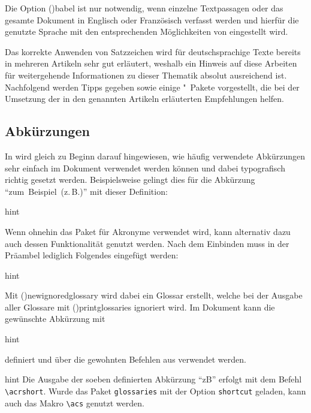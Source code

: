 \documentclass[%
  english,ngerman,%
  cdgeometry=no,DIV=12,%
  cd=false,cdfont=false,cdtitle=true,%
  headings=normal,%
  automark,%
  listof=toc,%
]{tudscrartcl}
\newcommand*\newabbreviation[4][]{%
    \newacronym[type=abbreviation,#1]{#2}{#3}{#4}%
  }%
\begin{document}
Die Option \Option(){babel} ist nur notwendig, wenn einzelne 
Textpassagen oder das gesamte Dokument in Englisch oder Französisch verfasst 
werden und hierfür die genutzte Sprache mit den entsprechenden Möglichkeiten 
von  eingestellt wird.

Das korrekte Anwenden von Satzzeichen wird für deutschsprachige Texte bereits 
in mehreren Artikeln \cite{neubauer1996,neubauer1997,struckmann2007,bier2009} 
sehr gut erläutert, weshalb ein Hinweis auf diese Arbeiten für weitergehende 
Informationen zu dieser Thematik absolut ausreichend ist. Nachfolgend werden 
Tipps gegeben sowie einige "~Pakete vorgestellt, die bei der 
Umsetzung der in den genannten Artikeln erläuterten Empfehlungen helfen.



\subsection{Abkürzungen}

In \cite{struckmann2007} wird gleich zu Beginn darauf hingewiesen, wie häufig 
verwendete Abkürzungen sehr einfach im Dokument verwendet werden können und 
dabei typografisch richtig gesetzt werden. Beispielsweise gelingt dies für die 
Abkürzung \enquote{zum~Beispiel~(z.\,B.)} mit dieser Definition:
%
\begin{Code}{hint}
\newcommand*\zB{\mbox{z.\,B.}\xspace}
\end{Code}

Wenn ohnehin das Paket  für Akronyme verwendet wird, kann 
alternativ dazu auch dessen Funktionalität genutzt werden. Nach dem Einbinden 
muss in der Präambel lediglich Folgendes eingefügt werden:
%
\begin{Code}{hint}
  \newcommand*\newabbreviation[4][]{%
    \newacronym[type=abbreviation,#1]{#2}{\mbox{#3\xspace}}{#4}%
  }%
\end{Code}

Mit \Macro(){newignoredglossary} wird dabei ein Glossar 
erstellt, welche bei der Ausgabe aller Glossare mit 
\Macro(){printglossaries} ignoriert wird. Im Dokument kann 
die gewünschte Abkürzung mit 
%
\CodeHook{\renewcommand*\newglossaryentry[2]{}}
\begin{Code}[input]{hint}
\newabbreviation{zB}{z.\,B.}{zum Beispiel}
\end{Code}

definiert und über die gewohnten Befehlen aus  verwendet 
werden.
%
\begin{Code}[input]{hint}
Die Ausgabe der soeben definierten Abkürzung \enquote{\acrshort{zB}}
erfolgt mit dem Befehl \texttt{\textbackslash acrshort}. Wurde das
Paket \texttt{glossaries} mit der Option \texttt{shortcut} geladen, 
kann auch das Makro \texttt{\textbackslash acs} genutzt werden.
\end{Code}
\end{document}
